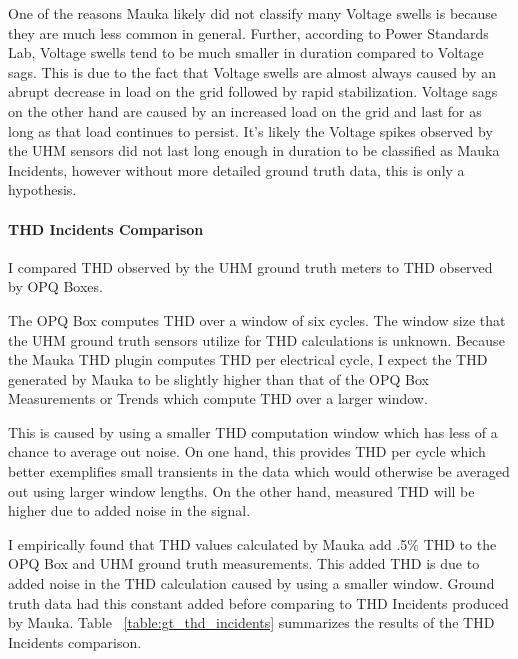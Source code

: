 One of the reasons Mauka likely did not classify many Voltage swells is because they are much less common in general. Further, according to Power Standards Lab\cite{power_standards_lab_2017}, Voltage swells tend to be much smaller in duration compared to Voltage sags. This is due to the fact that Voltage swells are almost always caused by an abrupt decrease in load on the grid followed by rapid stabilization. Voltage sags on the other hand are caused by an increased load on the grid and last for as long as that load continues to persist. It's likely the Voltage spikes observed by the UHM sensors did not last long enough in duration to be classified as Mauka Incidents, however without more detailed ground truth data, this is only a hypothesis.

\paragraph{THD Incidents Comparison}

I compared THD observed by the UHM ground truth meters to THD observed by OPQ Boxes.

The OPQ Box computes THD over a window of six cycles. The window size that the UHM ground truth sensors utilize for THD calculations is unknown. Because the Mauka THD plugin computes THD per electrical cycle, I expect the THD generated by Mauka to be slightly higher than that of the OPQ Box Measurements or Trends which compute THD over a larger window.

This is caused by using a smaller THD computation window which has less of a chance to average out noise. On one hand, this provides THD per cycle which better exemplifies small transients in the data which would otherwise be averaged out using larger window lengths. On the other hand, measured THD will be higher due to added noise in the signal.

I empirically found that THD values calculated by Mauka add .5\% THD to the OPQ Box and UHM ground truth measurements. This added THD is due to added noise in the THD calculation caused by using a smaller window. Ground truth data had this constant added before comparing to THD Incidents produced by Mauka. Table ~\ref{table:gt_thd_incidents} summarizes the results of the THD Incidents comparison.


